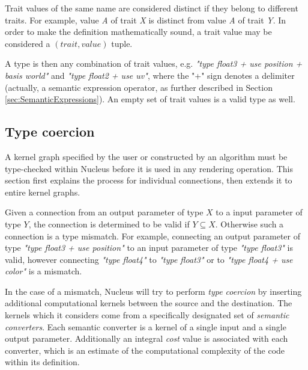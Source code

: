 Trait values of the same name are considered distinct if they belong to different traits. For example, value \emph{A} of trait \emph{X} is distinct from value \emph{A} of trait \emph{Y}. In order to make the definition mathematically sound, a trait value may be considered a $(trait, value)$ tuple.

A type is then any combination of trait values, e.g. \emph{"type float3 + use position + basis world"} and \emph{"type float2 + use uv"}, where the "+" sign denotes a delimiter (actually, a semantic expression operator, as further described in Section \ref{sec:SemanticExpressions}). An empty set of trait values is a valid type as well.

\subsection{Type coercion}
\label{sec:TypeCoercion}

A kernel graph specified by the user or constructed by an algorithm must be type-checked within Nucleus before it is used in any rendering operation. This section first explains the process for individual connections, then extends it to entire kernel graphs.

Given a connection from an output parameter of type $X$ to a input parameter of type $Y$, the connection is determined to be valid if $Y \subseteq X$. Otherwise such a connection is a type mismatch. For example, connecting an output parameter of type \emph{"type float3 + use position"} to an input parameter of type \emph{"type float3"} is valid, however connecting \emph{"type float4"} to \emph{"type float3"} or to \emph{"type float4 + use color"} is a mismatch.

In the case of a mismatch, Nucleus will try to perform \emph{type coercion} by inserting additional computational kernels between the source and the destination. The kernels which it considers come from a specifically designated set of \emph{semantic converters}. Each semantic converter is a kernel of a single input and a single output parameter. Additionally an integral \emph{cost} value is associated with each converter, which is an estimate of the computational complexity of the code within its definition.

